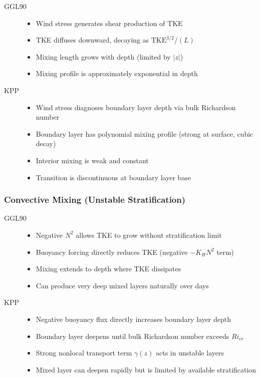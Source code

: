 \documentclass[11pt, a4paper]{article}
\begin{document}
\begin{description}
    \item[GGL90] 
    \begin{itemize}
        \item Wind stress generates shear production of TKE
        \item TKE diffuses downward, decaying as $\text{TKE}^{3/2}/(L)$
        \item Mixing length grows with depth (limited by $|z|$)
        \item Mixing profile is approximately exponential in depth
    \end{itemize}
    
    \item[KPP]
    \begin{itemize}
        \item Wind stress diagnoses boundary layer depth via bulk Richardson number
        \item Boundary layer has polynomial mixing profile (strong at surface, cubic decay)
        \item Interior mixing is weak and constant
        \item Transition is discontinuous at boundary layer base
    \end{itemize}
\end{description}

\subsubsection{Convective Mixing (Unstable Stratification)}

\begin{description}
    \item[GGL90]
    \begin{itemize}
        \item Negative $N^2$ allows TKE to grow without stratification limit
        \item Buoyancy forcing directly reduces TKE (negative $-K_H N^2$ term)
        \item Mixing extends to depth where TKE dissipates
        \item Can produce very deep mixed layers naturally over days
    \end{itemize}
    
    \item[KPP]
    \begin{itemize}
        \item Negative buoyancy flux directly increases boundary layer depth
        \item Boundary layer deepens until bulk Richardson number exceeds $Ri_{cr}$
        \item Strong nonlocal transport term $\gamma(z)$ acts in unstable layers
        \item Mixed layer can deepen rapidly but is limited by available stratification
    \end{itemize}
\end{description}
\end{document}
